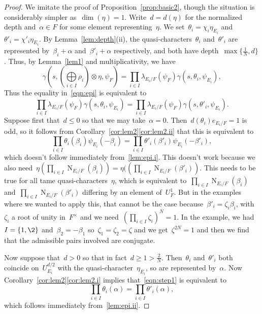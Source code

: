 \documentclass[12pt]{amsart}
\newcommand{\N}{\operatorname{N}}
\begin{document}
{\begin{proof}
We imitate the proof of Proposition~\ref{prop:basic2}, though the situation is considerably simpler as~$\dim(\eta)=1$. Write~$d=d(\eta)$ for the normalized depth and~$\alpha\in F$ for some element representing~$\eta$. We set~$\theta_{i}=\chi_i \eta_{E_i}$ and~$\theta'_{i}= \chi'_i \eta_{E_i}$. By Lemma~\ref{lem:depth}(ii), the quasi-characters~$\theta_{i}$ and~$\theta'_{i}$ are represented by~$\beta_i+\alpha$ and~$\beta'_i+\alpha$ respectively, and both have depth~$\max\{\frac 1N,d\}$. Thus, by Lemma~\ref{lem1} and multiplicativity, we have
\[
\gamma(s,({\textstyle\bigoplus\limits_{i\in I}\rho_i})\otimes\eta,\psi_F)= \prod_{i\in I} 
\lambda_{E_{i}/F}(\psi_F)\gamma(s,\theta_{i}, \psi_{E_{i}}),
\]
Thus the equality in~\ref{eqn:epi} is equivalent to
\begin{equation}
\label{eqn:step1}
\prod_{i\in I} 
\lambda_{E_{i}/F}(\psi_F)\gamma(s,\theta_{i}, \psi_{E_{i}}) = \prod_{i\in I} 
\lambda_{E_{i}/F}(\psi_F)\gamma(s,\theta'_{i}, \psi_{E_{i}}).
\end{equation}
Suppose first that~$d\le 0$ so that we may take~$\alpha=0$. Then~$d(\theta_i)e_{E_i/F} = 1$ is odd, so it follows from Corollary~\ref{cor:lem2}\ref{cor:lem2.ii} that this is equivalent to
\[
\prod_{i\in I} \theta_{i} (\beta_i) \psi_{E_i}(-\beta_i) = 
\prod_{i\in I}  \theta'_{i} (\beta'_i)\psi_{E_i}(-\beta'_i),
\]
which {\color{red} doesn't follow} immediately from~\ref{lem:epi.i}. 
{\color{red} This doesn't work because we also need~$\eta(\prod_{i\in I} \N_{E_i/F}(\beta_i)) = \eta((\prod_{i\in I} \N_{E_i/F}(\beta'_i))$. This needs to be true for all tame quasi-characters~$\eta$, which is equivalent to~$\prod_{i\in I} \N_{E_i/F}(\beta_i)$ and~$\prod_{i\in I} \N_{E_i/F}(\beta'_i)$ differing by an element of~$U_F^1$. But in the examples where we wanted to apply this, that cannot be the case because~$\beta'_i=\zeta_i\beta_i$, with~$\zeta_i$ a root of unity in~$F^\times$ and we need~$(\prod_{i\in I} \zeta_i)^N=1$. In the example, we had~$I=\{1,\2\}$ and~$\beta_2=-\beta_1$ so~$\zeta_1=\zeta_2=\zeta$ and we get~$\zeta^{2N}=1$ and then we find that the admissible pairs involved are conjugate.}

Now suppose that~$d>0$ so that in fact~$d \ge 1>\frac 2N$. Then~$\theta_{i}$ and~$\theta'_{i}$ both coincide on~$U^{d/2}_{E_i}$ with the quasi-character~$\eta_{E_i}$, so are represented by~$\alpha$. Now Corollary~\ref{cor:lem2}\ref{cor:lem2.i} implies that~\eqref{eqn:step1} is equivalent to
\[
\prod_{i\in I} \theta_i (\alpha) = 
\prod_{i\in I}  \theta'_i (\alpha),
\]
which follows immediately from~\ref{lem:epi.ii}.
\end{proof}
}
\fi
\end{document}
